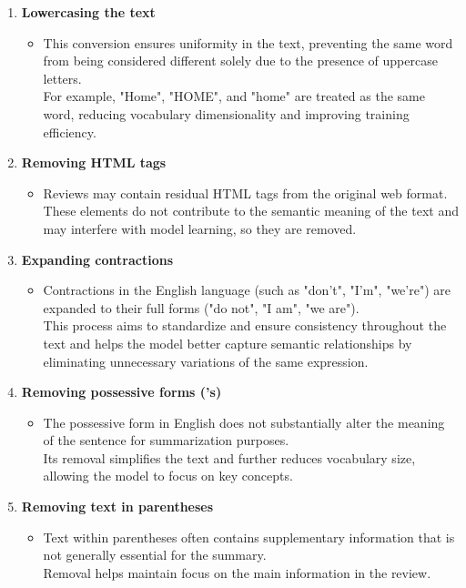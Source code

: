 \begin{enumerate}
    \item \textbf{Lowercasing the text}
    \begin{itemize}
        \item This conversion ensures uniformity in the text, preventing the same word from being considered different solely due to the presence of uppercase letters.\\For example, "Home", "HOME", and "home" are treated as the same word, reducing vocabulary dimensionality and improving training efficiency.
    \end{itemize}

    \item \textbf{Removing HTML tags}
    \begin{itemize}
        \item Reviews may contain residual HTML tags from the original web format. 
        These elements do not contribute to the semantic meaning of the text and may interfere with model learning, so they are removed.
    \end{itemize}

    \item \textbf{Expanding contractions}
    \begin{itemize}
        \item Contractions in the English language (such as "don't", "I'm", "we're") are expanded to their full forms ("do not", "I am", "we are").\\
        This process aims to standardize and ensure consistency throughout the text and helps the model better capture semantic relationships by eliminating unnecessary variations of the same expression.
    \end{itemize}

    \item \textbf{Removing possessive forms ('s)}
    \begin{itemize}
        \item The possessive form in English does not substantially alter the meaning of the sentence for summarization purposes.\\
        Its removal simplifies the text and further reduces vocabulary size, allowing the model to focus on key concepts.
    \end{itemize}

    \item \textbf{Removing text in parentheses}
    \begin{itemize}
        \item Text within parentheses often contains supplementary information that is not generally essential for the summary.\\
        Removal helps maintain focus on the main information in the review.
    \end{itemize}


\end{enumerate}
